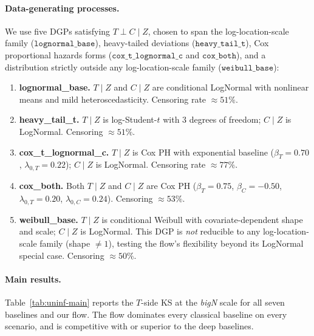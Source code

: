 \paragraph{Data-generating processes.}
We use five DGPs satisfying $T \perp C \mid Z$, chosen to span the
log-location-scale family ($\texttt{lognormal\_base}$), heavy-tailed
deviations ($\texttt{heavy\_tail\_t}$), Cox proportional hazards forms
($\texttt{cox\_t\_lognormal\_c}$ and $\texttt{cox\_both}$), and a
distribution strictly outside any log-location-scale family
($\texttt{weibull\_base}$):
\begin{enumerate}
    \item \textbf{lognormal\_base.} $T \mid Z$ and $C \mid Z$ are
          conditional LogNormal with nonlinear means and mild
          heteroscedasticity. Censoring rate $\approx 51\%$.
    \item \textbf{heavy\_tail\_t.} $T \mid Z$ is log-Student-$t$ with $3$
          degrees of freedom; $C \mid Z$ is LogNormal. Censoring
          $\approx 51\%$.
    \item \textbf{cox\_t\_lognormal\_c.} $T \mid Z$ is Cox PH with
          exponential baseline ($\beta_T = 0.70$, $\lambda_{0,T} = 0.22$);
          $C \mid Z$ is LogNormal. Censoring rate $\approx 77\%$.
    \item \textbf{cox\_both.} Both $T \mid Z$ and $C \mid Z$ are Cox PH
          ($\beta_T = 0.75$, $\beta_C = -0.50$,
          $\lambda_{0,T} = 0.20$, $\lambda_{0,C} = 0.24$). Censoring
          $\approx 53\%$.
    \item \textbf{weibull\_base.} $T \mid Z$ is conditional Weibull with
          covariate-dependent shape and scale; $C \mid Z$ is LogNormal.
          This DGP is \emph{not} reducible to any log-location-scale
          family (shape $\neq 1$), testing the flow's flexibility beyond
          its LogNormal special case. Censoring $\approx 50\%$.
\end{enumerate}

\paragraph{Main results.}
Table~\ref{tab:uninf-main} reports the $T$-side KS at the \emph{bigN}
scale for all seven baselines and our flow. The flow dominates every
classical baseline on every scenario, and is competitive with or superior
to the deep baselines.


